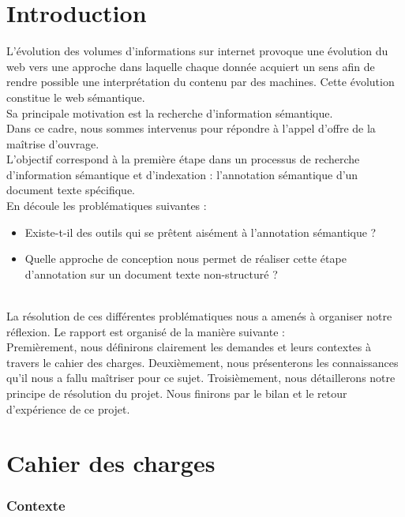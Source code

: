 \documentclass[a4paper, 11pt]{report}
\begin{document}
\part{Introduction}
L'évolution des volumes d'informations sur internet provoque une évolution du web vers une approche dans laquelle chaque donnée acquiert un sens afin de rendre possible une interprétation du contenu par des machines. Cette évolution constitue le web sémantique.\\
Sa principale motivation  est la recherche d’information sémantique.\\

Dans ce cadre, nous sommes intervenus pour répondre à l'appel d'offre de la maîtrise d'ouvrage. \\
L'objectif correspond à la première étape dans un processus de recherche d'information sémantique et d'indexation : l'annotation sémantique d'un document texte spécifique.\\

En découle les problématiques suivantes :
\begin{itemize}
\item Existe-t-il des outils qui se prêtent aisément à l'annotation sémantique ?
\item Quelle approche de conception nous permet de réaliser cette étape d'annotation sur un document texte non-structuré ?
\end{itemize}
    ~\\
    
La résolution de ces différentes problématiques nous a amenés à organiser notre réflexion. Le rapport est organisé de la manière suivante : \\
Premièrement, nous définirons clairement les demandes et leurs contextes à travers le cahier des charges. Deuxièmement, nous présenterons les connaissances qu'il nous a fallu maîtriser pour ce sujet. Troisièmement, nous détaillerons notre principe de résolution du projet. Nous finirons par le bilan et le retour d’expérience de ce projet.
\part{Cahier des charges}
    \section{Contexte}
\end{document}
